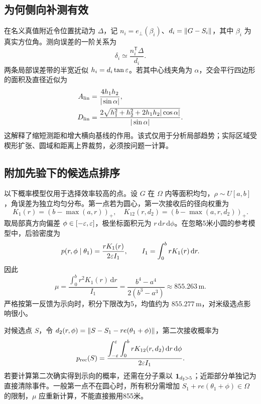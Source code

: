 \subsection{为何侧向补测有效}
在名义真值附近令位置扰动为 $\Delta$，记 $n_i=e_\perp(\beta_i)$、$d_i=\left\lVert G-S_i\right\rVert$，其中 $\beta_i$ 为真实方位角。测向误差的一阶关系为
\begin{equation}
\delta_i\simeq\frac{n_i^\mathsf T\Delta}{d_i}.
\end{equation}
两条局部误差带的半宽近似 $h_i=d_i\tan\varepsilon$。若其中心线夹角为 $\alpha$，交会平行四边形的面积及直径近似为
\begin{align}
A_{\rm lin}&=\frac{4h_1h_2}{|\sin\alpha|},\\
D_{\rm lin}&=\frac{2\sqrt{h_1^2+h_2^2+2h_1h_2|\cos\alpha|}}{|\sin\alpha|}.
\label{eq:linear-diameter}
\end{align}
这解释了缩短测距和增大横向基线的作用。该式仅用于分析局部趋势；实际区域受楔形扩张、圆域和距离上界裁剪，必须按问题一计算。

\subsection{附加先验下的候选点排序}
以下概率模型仅用于选择效率较高的点。设 $G$ 在 $\Omega$ 内等面积均匀，$\rho\sim U[a,b]$，角误差为独立均匀分布。第一点若为圆心，第一次接收后的径向权重为
\begin{equation}
K_1(r)=(b-\max(a,r))_+,\quad
K_{12}(r,d_2)=(b-\max(a,r,d_2))_+.
\label{eq:weights}
\end{equation}
取局部真方向偏差 $\phi\in[-\varepsilon,\varepsilon]$，极坐标面积元为 $r\,\mathrm dr\,\mathrm d\phi$。在忽略5米小圆的参考模型中，后验密度为
\begin{equation}
p(r,\phi\mid\theta_1)=\frac{rK_1(r)}{2\varepsilon I_1},\qquad
I_1=\int_0^b rK_1(r)\,\mathrm dr.
\end{equation}
因此
\begin{equation}
\mu=\frac{\int_0^b r^2K_1(r)\,\mathrm dr}{I_1}
=\frac{b^4-a^4}{2(b^3-a^3)}\approx855.263\,\mathrm m.
\label{eq:mu}
\end{equation}
严格按第一反馈为示向时，积分下限改为5，均值约为 $855.277\,\mathrm m$，对米级选点影响很小。

对候选点 $S$，令 $d_2(r,\phi)=\left\lVert S-S_1-r e(\theta_1+\phi)\right\rVert$，第二次接收概率为
\begin{equation}
p_{\rm rec}(S)=
\frac{\displaystyle\int_{-\varepsilon}^{\varepsilon}\int_0^b rK_{12}(r,d_2)\,\mathrm dr\,\mathrm d\phi}
{2\varepsilon I_1}.
\label{eq:prob}
\end{equation}
若要计算第二次确实得到示向的概率，还需在分子乘以 $\mathbf 1_{d_2>5}$；近距部分单独记为直接清除事件。一般第一点不在圆心时，所有积分需增加 $S_1+r e(\theta_1+\phi)\in\Omega$ 的限制，$\mu$ 应重新计算，不能直接搬用855米。

